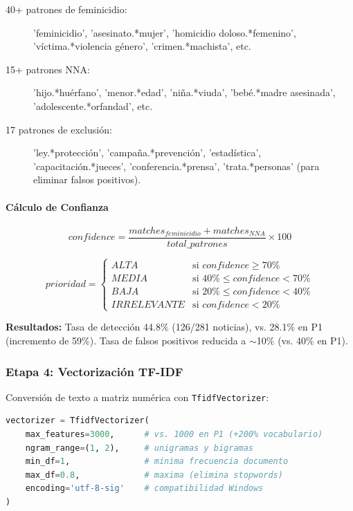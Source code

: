 \begin{description}
    \item[40+ patrones de feminicidio:] 'feminicidio', 'asesinato.*mujer', 'homicidio doloso.*femenino', 'víctima.*violencia género', 'crimen.*machista', etc.
    
    \item[15+ patrones NNA:] 'hijo.*huérfano', 'menor.*edad', 'niña.*viuda', 'bebé.*madre asesinada', 'adolescente.*orfandad', etc.
    
    \item[17 patrones de exclusión:] 'ley.*protección', 'campaña.*prevención', 'estadística', 'capacitación.*jueces', 'conferencia.*prensa', 'trata.*personas' (para eliminar falsos positivos).
\end{description}

\paragraph{Cálculo de Confianza}

\begin{equation}
confidence = \frac{matches_{feminicidio} + matches_{NNA}}{total\_patrones} \times 100
\end{equation}

\begin{equation}
prioridad = 
\begin{cases}
ALTA & \text{si } confidence \geq 70\% \\
MEDIA & \text{si } 40\% \leq confidence < 70\% \\
BAJA & \text{si } 20\% \leq confidence < 40\% \\
IRRELEVANTE & \text{si } confidence < 20\%
\end{cases}
\end{equation}

\textbf{Resultados:} Tasa de detección 44.8\% (126/281 noticias), vs. 28.1\% en P1 (incremento de 59\%). Tasa de falsos positivos reducida a $\sim$10\% (vs. 40\% en P1).

\subsubsection{Etapa 4: Vectorización TF-IDF}

Conversión de texto a matriz numérica con \texttt{TfidfVectorizer}:

\begin{lstlisting}[language=Python, caption={Configuración TF-IDF del Prototipo 2}]
vectorizer = TfidfVectorizer(
    max_features=3000,      # vs. 1000 en P1 (+200% vocabulario)
    ngram_range=(1, 2),     # unigramas y bigramas
    min_df=1,               # minima frecuencia documento
    max_df=0.8,             # maxima (elimina stopwords)
    encoding='utf-8-sig'    # compatibilidad Windows
)
\end{lstlisting}


